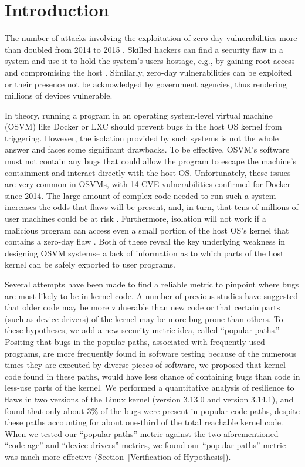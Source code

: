 \section{Introduction}
\label{sec.introduction}

The number of attacks involving the exploitation of zero-day vulnerabilities more than doubled 
from 2014 to 2015 \cite{zero-day}. Skilled hackers can find a security flaw in a system and use it to hold the system's users hostage, e.g., 
by gaining root access and compromising the host \cite{linux-0day}. Similarly, zero-day
vulnerabilities can be exploited \cite{fbi-0day} or their presence not be acknowledged \cite{nsa-0day} 
by government agencies, thus rendering millions of devices vulnerable.

In theory, running a program in an operating system-level virtual machine (OSVM) like Docker \cite{Docker} or LXC \cite{LXC} should
prevent bugs in the host OS kernel from triggering. 
However, the isolation provided by such systems is not the whole answer and faces some significant drawbacks. 
To be effective, OSVM's software must not contain any bugs that could allow the program to escape the machine's containment 
and interact directly with the host OS. 
Unfortunately, these issues are very common in OSVMs, with 14 CVE vulnerabilities confirmed for Docker \cite{Docker-Vulnerabilities} since 2014. 
The large amount of complex code needed to run such a system increases the odds that flaws will be present, and, in turn, 
that tens of millions of user machines could be at risk \cite{linux-0day}.
Furthermore, isolation will not work if a malicious program can access even a small portion of the host OS's kernel 
that contains a zero-day flaw \cite{CVE-2016-5195}. 
Both of these reveal the key underlying weakness in designing OSVM systems-- a lack of information 
as to which parts of the host kernel can be safely exported to user programs. 

Several attempts have been made to find a reliable metric to pinpoint where bugs are most likely to be in kernel code. 
A number of previous studies have suggested that older code may be more vulnerable than new code \cite{ozment2006milk}  
or that certain parts (such as device drivers) of the kernel \cite{PittSFIeld} may be more bug-prone than others. 
To these hypotheses, we add a new security metric idea, called ``popular paths.'' 
Positing that bugs in the popular paths, associated with frequently-used programs, are more frequently found in software testing 
because of the numerous times they are executed by diverse pieces of software, we proposed that kernel code found in these paths, 
would have less chance of containing bugs than code in less-use parts of the kernel. 
We performed a quantitative analysis of resilience to flaws in two versions of the Linux kernel (version 3.13.0 and version 3.14.1), 
and found that only about 3\% of the bugs were present in popular code paths, 
despite these paths accounting for about one-third of the total reachable kernel code. 
When we tested our ``popular paths'' metric against the two aforementioned ``code age'' and ``device drivers'' metrics, 
we found our ``popular paths'' metric was much more effective (Section~{\ref{Verification-of-Hypothesis}}). 

